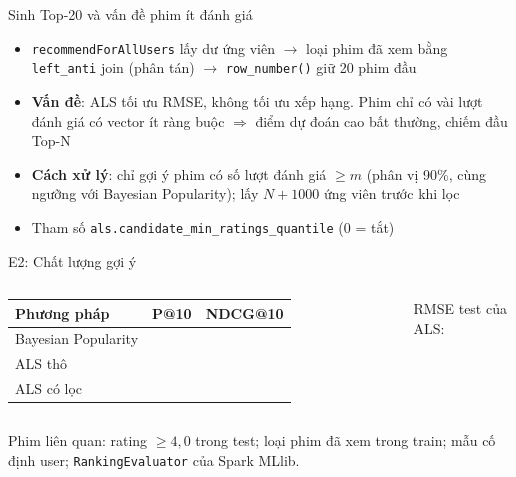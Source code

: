\begin{frame}{Sinh Top-20 và vấn đề phim ít đánh giá}
  \begin{itemize}
    \item \texttt{recommendForAllUsers} lấy dư ứng viên $\rightarrow$ loại phim đã xem bằng
      \texttt{left\_anti} join (phân tán) $\rightarrow$ \texttt{row\_number()} giữ 20 phim đầu
    \item \textbf{Vấn đề}: ALS tối ưu RMSE, không tối ưu xếp hạng. Phim chỉ có vài lượt đánh giá
      có vector ít ràng buộc $\Rightarrow$ điểm dự đoán cao bất thường, chiếm đầu Top-N
    \item \textbf{Cách xử lý}: chỉ gợi ý phim có số lượt đánh giá $\ge m$
      (phân vị 90\%, cùng ngưỡng với Bayesian Popularity); lấy $N + 1000$ ứng viên trước khi lọc
    \item Tham số \texttt{als.candidate\_min\_ratings\_quantile} (0 = tắt)
  \end{itemize}
\end{frame}

\begin{frame}{E2: Chất lượng gợi ý}
  \begin{columns}[c]
    \centering\small
    \begin{tabular}{l c c}
      \toprule
      \textbf{Phương pháp} & \textbf{P@10} & \textbf{NDCG@10} \\
      \midrule
      Bayesian Popularity & \todo{} & \todo{} \\
      ALS thô             & \todo{} & \todo{} \\
      ALS có lọc          & \todo{} & \todo{} \\
      \bottomrule
    \end{tabular}
    \par\medskip
    RMSE test của ALS: \todo{}
    \centering
  \end{columns}
  \smallskip
  {\footnotesize Phim liên quan: rating $\ge 4{,}0$ trong test; loại phim đã xem trong train;
    mẫu cố định \todo{} user; \texttt{RankingEvaluator} của Spark MLlib.}
\end{frame}

